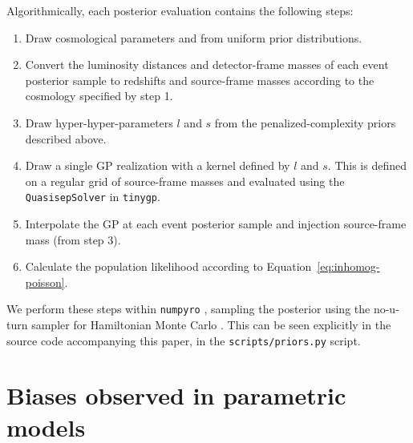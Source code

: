\documentclass[preprint2,linenumbers]{aastex631}
\begin{document}
Algorithmically, each posterior evaluation contains the following steps: 
\begin{enumerate}
    \item Draw cosmological parameters \Ho{} and \Omm{} from uniform prior distributions.
    \item Convert the luminosity distances and detector-frame masses of each event posterior sample to redshifts and source-frame masses according to the cosmology specified by step 1.
    \item Draw hyper-hyper-parameters $l$ and $s$ from the penalized-complexity priors described above.
    \item Draw a single \ac{GP} realization with a kernel defined by $l$ and $s$.
    This is defined on a regular grid of source-frame masses and evaluated using the \texttt{QuasisepSolver} in \texttt{tinygp}.
    \item Interpolate the \ac{GP} at each event posterior sample and injection source-frame mass (from step 3).
    \item Calculate the population likelihood according to Equation~\ref{eq:inhomog-poisson}.
\end{enumerate}
We perform these steps within \texttt{numpyro} \citep{bingham_pyro_2019,phan_composable_2019}, sampling the posterior using the no-u-turn sampler for Hamiltonian Monte Carlo \citep{hoffman_no-u-turn_2011}. 
This can be seen explicitly in the source code accompanying this paper, in the \texttt{scripts/priors.py} script.

\section{Biases observed in parametric models}
\label{ap:parametric bias}
\end{document}
